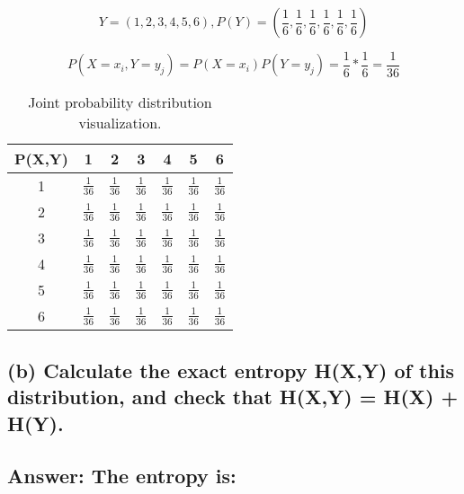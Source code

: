 \documentclass[15px]{article}
\begin{document}
\begin{equation}
Y = (1, 2, 3, 4, 5, 6), P(Y) = (\frac{1}{6},\frac{1}{6},\frac{1}{6},\frac{1}{6},\frac{1}{6},\frac{1}{6})
\end{equation}

\begin{equation}
P(X = x_i,Y = y_j) = P(X = x_i)P(Y = y_j) = \frac{1}{6}*\frac{1}{6} = \frac{1}{36}
\end{equation}

\begin{table}[ht]
\centering
\begin{adjustbox}{width=0.5\linewidth}
\begin{tabular}{|c|c|c|c|c|c|c|}
\hline
P(X,Y) & 1 & 2 & 3 & 4 & 5 & 6 \\ \hline
1 & \(\frac{1}{36}\) & \(\frac{1}{36}\) & \(\frac{1}{36}\) & \(\frac{1}{36}\) & \(\frac{1}{36}\) & \(\frac{1}{36}\) \\ \hline
2 & \(\frac{1}{36}\) & \(\frac{1}{36}\) & \(\frac{1}{36}\) & \(\frac{1}{36}\) & \(\frac{1}{36}\) & \(\frac{1}{36}\) \\ \hline
3 &\(\frac{1}{36}\) & \(\frac{1}{36}\) & \(\frac{1}{36}\) & \(\frac{1}{36}\) & \(\frac{1}{36}\) & \(\frac{1}{36}\) \\ \hline
4 &\(\frac{1}{36}\) & \(\frac{1}{36}\) & \(\frac{1}{36}\) & \(\frac{1}{36}\) & \(\frac{1}{36}\) & \(\frac{1}{36}\) \\ \hline
5 &\(\frac{1}{36}\) & \(\frac{1}{36}\) & \(\frac{1}{36}\) & \(\frac{1}{36}\) & \(\frac{1}{36}\) & \(\frac{1}{36}\) \\ \hline
6 &\(\frac{1}{36}\) & \(\frac{1}{36}\) & \(\frac{1}{36}\) & \(\frac{1}{36}\) & \(\frac{1}{36}\) & \(\frac{1}{36}\) \\ \hline
\end{tabular}
\end{adjustbox}
\caption{Joint probability distribution visualization.} 
\end{table}

\subsection*{\normalfont (b) Calculate the exact entropy H(X,Y) of this distribution, and check that H(X,Y) = H(X) + H(Y).}

\subsection*{ Answer: The entropy is:}
\end{document}
